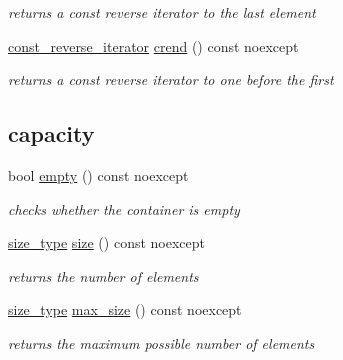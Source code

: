 \begin{DoxyCompactItemize}
\begin{DoxyCompactList}\small\item\em returns a const reverse iterator to the last element \end{DoxyCompactList}\item 
\hyperlink{a00025_ae336fff01f4b78e3e16e5008dc8dbc00}{const\+\_\+reverse\+\_\+iterator} \hyperlink{a00025_aae7eb3b91d7f68e86396c5c6b683445f}{crend} () const  noexcept
\begin{DoxyCompactList}\small\item\em returns a const reverse iterator to one before the first \end{DoxyCompactList}\end{DoxyCompactItemize}
\subsection*{capacity}
\begin{DoxyCompactItemize}
\item 
bool \hyperlink{a00025_a90239431815c94b0a334f7f4c55eb859}{empty} () const  noexcept
\begin{DoxyCompactList}\small\item\em checks whether the container is empty \end{DoxyCompactList}\item 
\hyperlink{a00025_a1579a8f72a230358d6cd1a6e8a62859b}{size\+\_\+type} \hyperlink{a00025_a01833b332b68d9af1f7cd7a816c39e49}{size} () const  noexcept
\begin{DoxyCompactList}\small\item\em returns the number of elements \end{DoxyCompactList}\item 
\hyperlink{a00025_a1579a8f72a230358d6cd1a6e8a62859b}{size\+\_\+type} \hyperlink{a00025_ad5514a7435f246fc5335856465022a7a}{max\+\_\+size} () const  noexcept
\begin{DoxyCompactList}\small\item\em returns the maximum possible number of elements \end{DoxyCompactList}\end{DoxyCompactItemize}
